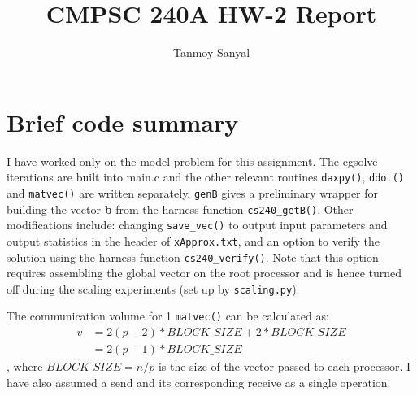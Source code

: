 \documentclass[12pt,letterpaper]{article}
\author{Tanmoy Sanyal}
\title{CMPSC 240A HW-2 Report}
\begin{document}
\maketitle

\section*{Brief code summary}
\noindent I have worked only on the model problem for this assignment. The cgsolve iterations are built into main.c and the other relevant routines \texttt{daxpy()}, \texttt{ddot()} and \texttt{matvec()} are written separately. \texttt{genB} gives a preliminary wrapper for building the vector \textbf{b} from the harness function \texttt{cs240\_getB()}. Other modifications include: changing \texttt{save\_vec()} to output input parameters and output statistics in the header of \texttt{xApprox.txt}, and an option to verify the solution using the harness function \texttt{cs240\_verify()}. Note that this option requires assembling the global vector on the root processor and is hence turned off during the scaling experiments (set up by \texttt{scaling.py}).

\noindent The communication volume for 1 \texttt{matvec()} can be calculated as:
\begin{align*}
v & = 2(p-2) * BLOCK\_SIZE + 2 * BLOCK\_SIZE \\
  & = 2(p-1)*BLOCK\_SIZE
\end{align*}
\noindent, where $BLOCK\_SIZE = n/p$ is the size of the vector passed to each processor. I have also assumed a send and its corresponding receive as a single operation.
\end{document}

